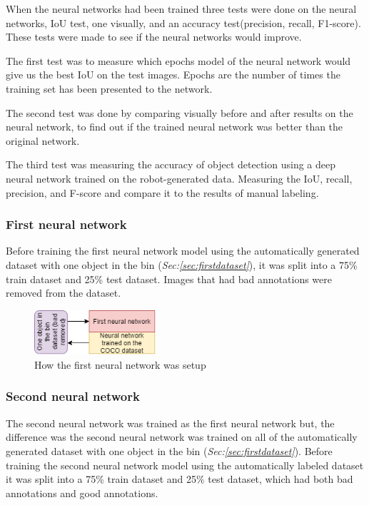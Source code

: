 When the neural networks had been trained three tests were done on the neural networks, IoU test, one visually, and an accuracy test(precision, recall, F1-score). These tests were made to see if the neural networks would improve. 

The first test was to measure which epochs model of the neural network would give us the best IoU on the test images. Epochs are the number of times the training set has been presented to the network.

The second test was done by comparing visually before and after results on the neural network, to find out if the trained neural network was better than the original network.

The third test was measuring the accuracy of object detection using a deep neural network trained on the robot-generated data. Measuring the IoU, recall, precision, and F-score and compare it to the results of manual labeling. 


\subsubsection{First neural network}
Before training the first neural network model using the automatically generated dataset with one object in the bin (\textit{Sec:\ref{sec:firstdataset}}), it was split into a 75\% train dataset and 25\% test dataset. Images that had bad annotations were removed from the dataset. 

\begin{figure}[h]
    \centering
    \includegraphics[width=0.4\textwidth]{graphics/methods/firstneural.png}
    \caption{How the first neural network was setup}
    \label{fig:firstneural}
\end{figure}

\subsubsection{Second neural network}
The second neural network was trained as the first neural network but, the difference was the second neural network was trained on all of the automatically generated dataset with one object in the bin (\textit{Sec:\ref{sec:firstdataset}}). Before training the second neural network model using the automatically labeled dataset it was split into a 75\% train dataset and 25\% test dataset, which had both bad annotations and good annotations. 

